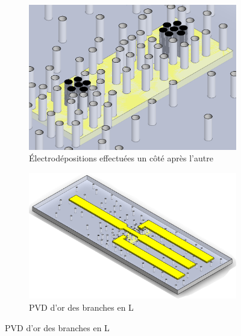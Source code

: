 \begin{itemize}
\begin{figure}[H]
\begin{subfigure}{0.45\textwidth}
              \end{subfigure}
              \newline
              \begin{subfigure}{0.45\textwidth}
                  \includegraphics[scale = 0.27]{assets/figures/ED.png}
                  \caption{Électrodépositions effectuées un côté après l'autre}
              \end{subfigure}
              \begin{subfigure}{0.45\textwidth}
                  \includegraphics[scale = 0.27]{assets/figures/PVD_L.png}
                  \caption{PVD d'or des branches en L}
              \end{subfigure}
          \end{figure}
          

\end{itemize}
